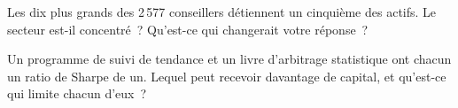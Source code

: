 \begin{interviewq}\label{iq:in:quantitative-hedge-funds-and-systematic-managers:5}
Les dix plus grands des 2\,577 conseillers détiennent un cinquième des actifs. Le secteur est-il concentré~? Qu'est-ce qui
changerait votre réponse~?
\end{interviewq}

\begin{interviewq}\label{iq:in:quantitative-hedge-funds-and-systematic-managers:6}
Un programme de suivi de tendance et un livre d'arbitrage statistique ont chacun un ratio de Sharpe de un. Lequel peut recevoir
davantage de capital, et qu'est-ce qui limite chacun d'eux~?
\end{interviewq}
